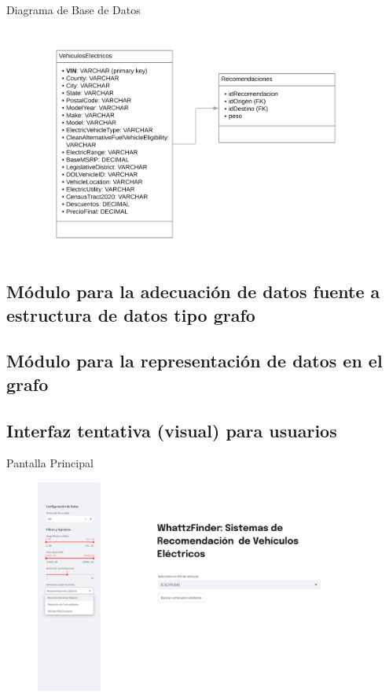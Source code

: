 \documentclass[12pt]{article}
\begin{document}
Diagrama de Base de Datos
\begin{figure}[htbp]
    \centering
    \includegraphics[width=\textwidth]{./imgs-latex/diagramadebase.png}\label{fig:diagramadebase}
\end{figure}


\subsection{Módulo para la adecuación de datos fuente a estructura de datos tipo grafo}
\subsection{Módulo para la representación de datos en el grafo}
\subsection{Interfaz tentativa (visual) para usuarios}

Pantalla Principal
\begin{figure}[htbp]
    \centering
    \includegraphics[width=\textwidth]{./imgs-latex/img1.png}\label{fig:img1}
\end{figure}
\end{document}
